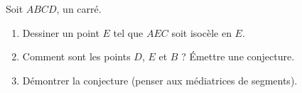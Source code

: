 
\begin{exercice}\label{exoSeconde-0081}

    Soit \( ABCD\), un carré.
    \begin{enumerate}
        \item
            Dessiner un point \( E\) tel que \( AEC\) soit isocèle en \( E\).
        \item
            Comment sont les points \( D\), \( E\) et \( B\) ? Émettre une conjecture.
        \item
            Démontrer la conjecture (penser aux médiatrices de segments).
    \end{enumerate}

\end{exercice}
